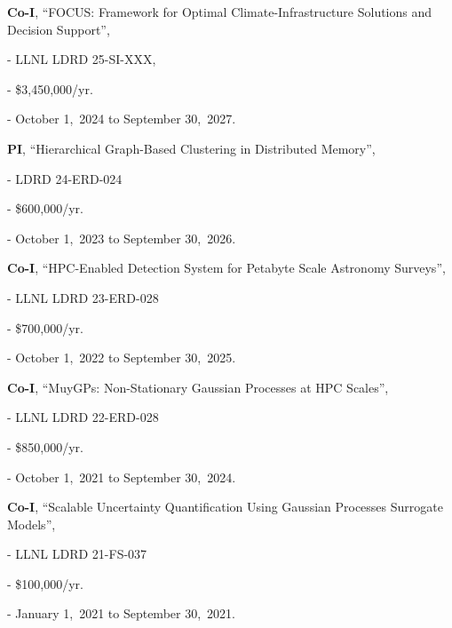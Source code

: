 \begin{innerlist}

  \item[] \textbf{Co-I},
    ``FOCUS: Framework for Optimal Climate-Infrastructure Solutions and Decision Support'',
  \begin{innerlist}
    \item[-] LLNL LDRD 25-SI-XXX,
    \item[-] \$3,450,000/yr.
    \item[-] October 1,~2024 to September 30,~2027.
  \end{innerlist}

  \item[] \textbf{PI},
  ``Hierarchical Graph-Based Clustering in Distributed Memory'',
  \begin{innerlist}
    \item[-] LDRD 24-ERD-024
    \item[-] \$600,000/yr.
    \item[-] October 1,~2023 to September 30,~2026.
  \end{innerlist}

  \item[] \textbf{Co-I},
  ``HPC-Enabled Detection System for Petabyte Scale Astronomy Surveys'',
  \begin{innerlist}
    \item[-] LLNL LDRD 23-ERD-028
    \item[-] \$700,000/yr.
    \item[-] October 1,~2022 to September 30,~2025.
  \end{innerlist}

  \item[] \textbf{Co-I},
  ``MuyGPs: Non-Stationary Gaussian Processes at HPC Scales'',
  \begin{innerlist}
    \item[-] LLNL LDRD 22-ERD-028
    \item[-] \$850,000/yr.
    \item[-] October 1,~2021 to September 30,~2024.
  \end{innerlist}

  \item[] \textbf{Co-I},
  ``Scalable Uncertainty Quantification Using Gaussian Processes Surrogate Models'',
  \begin{innerlist}
    \item[-] LLNL LDRD 21-FS-037
    \item[-] \$100,000/yr.
    \item[-] January 1,~2021 to September 30,~2021.
  \end{innerlist}


\end{innerlist}
